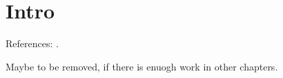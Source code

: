 \section{Intro}

References: \parencite{crystal2,crystal3,crystal2012}.

Maybe to be removed, if there is enuogh work in other chapters.
